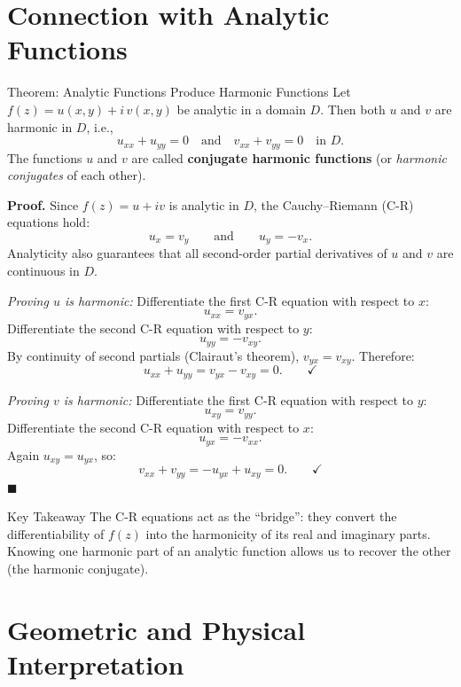 \documentclass[12pt,a4paper]{article}
\begin{document}
\section{Connection with Analytic Functions}

\begin{infobox}{Theorem: Analytic Functions Produce Harmonic Functions}
Let $f(z) = u(x,y) + i\,v(x,y)$ be analytic in a domain $D$. Then both $u$ and $v$ are
harmonic in $D$, i.e.,
\[
  u_{xx}+u_{yy}=0 \quad \text{and} \quad v_{xx}+v_{yy}=0 \quad \text{in } D.
\]
The functions $u$ and $v$ are called \textbf{conjugate harmonic functions} (or \emph{harmonic
conjugates} of each other).
\end{infobox}

\medskip

\textbf{Proof.} Since $f(z)=u+iv$ is analytic in $D$, the Cauchy--Riemann (C-R) equations hold:
\[
  u_{x} = v_{y} \qquad \text{and} \qquad u_{y} = -v_{x}. \tag{CR}
\]
Analyticity also guarantees that all second-order partial derivatives of $u$ and $v$ are
continuous in $D$.

\medskip
\textit{Proving $u$ is harmonic:} Differentiate the first C-R equation with respect to $x$:
\[
  u_{xx} = v_{yx}.
\]
Differentiate the second C-R equation with respect to $y$:
\[
  u_{yy} = -v_{xy}.
\]
By continuity of second partials (Clairaut's theorem), $v_{yx}=v_{xy}$. Therefore:
\[
  u_{xx}+u_{yy} = v_{yx} - v_{xy} = 0. \qquad \checkmark
\]

\textit{Proving $v$ is harmonic:} Differentiate the first C-R equation with respect to $y$:
\[
  u_{xy} = v_{yy}.
\]
Differentiate the second C-R equation with respect to $x$:
\[
  u_{yx} = -v_{xx}.
\]
Again $u_{xy}=u_{yx}$, so:
\[
  v_{xx}+v_{yy} = -u_{yx} + u_{xy} = 0. \qquad \checkmark
\]
\hfill$\blacksquare$

\begin{learnbox}{Key Takeaway}
The C-R equations act as the ``bridge'': they convert the differentiability of $f(z)$ into
the harmonicity of its real and imaginary parts. Knowing one harmonic part of an analytic
function allows us to recover the other (the harmonic conjugate).
\end{learnbox}

\section{Geometric and Physical Interpretation}
\end{document}
